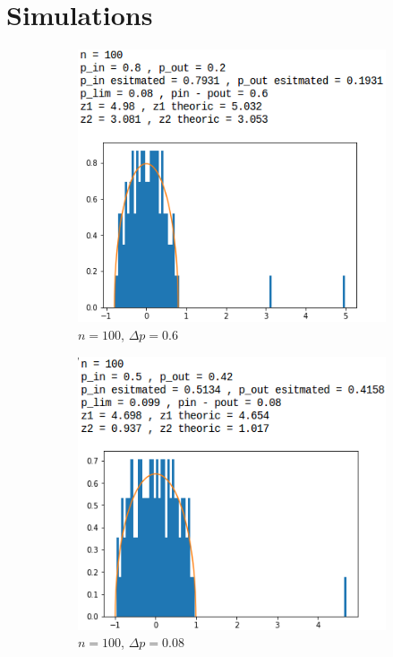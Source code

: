 \section{Simulations}
\begin{figure}[p]
	\begin{subfigure}{.5\textwidth}
		\centering
		\includegraphics[scale=0.58]{static/spectral_n100_pin08_pout02.png}
		\caption{$n=100$, $\Delta p=0.6$}
		\label{n100delta05}
	\end{subfigure}
	\begin{subfigure}{.5\textwidth}
		\centering
		\includegraphics[scale=0.58]{static/spectral_n100_pin05_pout042.png}
		\caption{$n=100$, $\Delta p=0.08$}
		\label{n100delta008}
	\end{subfigure}
	\begin{subfigure}{.5\textwidth}

\end{subfigure}
\end{figure}
